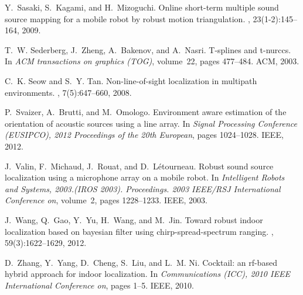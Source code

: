 \begin{thebibliography}{40}
Y.~Sasaki, S.~Kagami, and H.~Mizoguchi.
\newblock Online short-term multiple sound source mapping for a mobile robot by
  robust motion triangulation.
, 23(1-2):145--164, 2009.

T.~W. Sederberg, J.~Zheng, A.~Bakenov, and A.~Nasri.
\newblock T-splines and t-nurccs.
\newblock In {\em ACM transactions on graphics (TOG)}, volume~22, pages
  477--484. ACM, 2003.

C.~K. Seow and S.~Y. Tan.
\newblock Non-line-of-sight localization in multipath environments.
, 7(5):647--660, 2008.

P.~Svaizer, A.~Brutti, and M.~Omologo.
\newblock Environment aware estimation of the orientation of acoustic sources
  using a line array.
\newblock In {\em Signal Processing Conference (EUSIPCO), 2012 Proceedings of
  the 20th European}, pages 1024--1028. IEEE, 2012.

J.~Valin, F.~Michaud, J.~Rouat, and D.~L{\'e}tourneau.
\newblock Robust sound source localization using a microphone array on a mobile
  robot.
\newblock In {\em Intelligent Robots and Systems, 2003.(IROS 2003).
  Proceedings. 2003 IEEE/RSJ International Conference on}, volume~2, pages
  1228--1233. IEEE, 2003.

J.~Wang, Q.~Gao, Y.~Yu, H.~Wang, and M.~Jin.
\newblock Toward robust indoor localization based on bayesian filter using
  chirp-spread-spectrum ranging.
, 59(3):1622--1629,
  2012.

D.~Zhang, Y.~Yang, D.~Cheng, S.~Liu, and L.~M. Ni.
\newblock Cocktail: an rf-based hybrid approach for indoor localization.
\newblock In {\em Communications (ICC), 2010 IEEE International Conference on},
  pages 1--5. IEEE, 2010.

\end{thebibliography}


